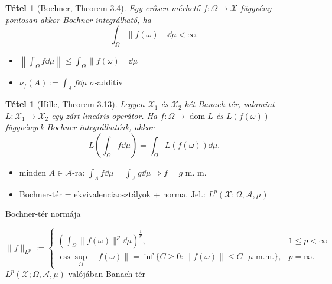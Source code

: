 \documentclass{beamer} %
\newtheorem{theo}[lem]{Tétel}
\DeclareMathOperator{\dom}{dom}
\DeclareMathOperator{\ess}{ess}
\begin{document}
\begin{frame}
\justifying
\begin{theo}[Bochner, Theorem 3.4] Egy erősen mérhető $f \colon \Omega \to \mathcal{X}$ függvény pontosan akkor Bochner-integrálható, ha
$$\int_{\Omega} \| f(\omega) \| \dd{\mu} < \infty.$$
\end{theo}
\begin{itemize}
\pause \item $\left \| \int_{\Omega} f \dd{\mu} \right\| \leqslant \int_{\Omega} \| f(\omega) \| \dd{\mu}$
\pause \item $\nu_f(A) := \int_{A} f \dd{\mu}$ $\sigma$-additív
\end{itemize}
\end{frame}

\begin{frame}
\justifying
\begin{theo}[Hille, Theorem 3.13] Legyen $\mathcal{X}_1$ és $\mathcal{X}_2$ két Banach-tér, valamint $L \colon \mathcal{X}_1 \to \mathcal{X}_2$ egy zárt lineáris operátor. Ha $f \colon \Omega \to \dom L$ és $L(f(\omega))$ függvények Bochner-integrálhatóak, akkor
$$L\left(\int_{\Omega} f \dd{\mu} \right) = \int_{\Omega} L(f(\omega)) \dd{\mu}.$$
\end{theo}
\begin{itemize}
\pause \item minden $A \in \mathcal{A}$-ra: $\int_{A} f \dd{\mu} = \int_{A} g \dd{\mu} \Longrightarrow f = g$ m. m.
\pause \item Bochner-tér = ekvivalenciaosztályok + norma. Jel.: $L^p(\mathcal{X}; \Omega, \mathcal{A}, \mu)$
\end{itemize}

\pause Bochner-tér normája

\begin{displaymath}
 \| f \|_{L^p} := \left\{
    \begin{array}{ll}
      \left(\int_{\Omega} \| f(\omega) \|^p  \dd{\mu} \right)^{\frac{1}{p}}, &  1 \leqslant p < \infty \\
      \ess\sup_{\Omega} \|f(\omega)\| = \inf \lbrace C \geqslant 0 : \|f(\omega)\| \leqslant C \text{ $\mu$-m.m.} \rbrace, &  p = \infty.
    \end{array}
  \right.
\end{displaymath}
\pause $L^p(\mathcal{X}; \Omega, \mathcal{A}, \mu)$ valójában Banach-tér
\end{frame}
\end{document}
